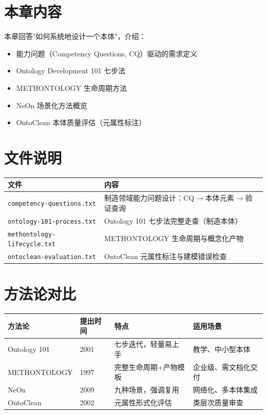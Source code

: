 
\section{本章内容}

本章回答"如何系统地设计一个本体"，介绍：
\begin{itemize}
\item 能力问题（Competency Questions, CQ）驱动的需求定义
\item Ontology Development 101 七步法
\item METHONTOLOGY 生命周期方法
\item NeOn 场景化方法概览
\item OntoClean 本体质量评估（元属性标注）
\end{itemize}

\section{文件说明}

\begin{center}
\begin{tabularx}{\linewidth}{@{}XX@{}}
\toprule
\textbf{文件} & \textbf{内容} \\
\midrule
\texttt{competency-questions.txt} & 制造领域能力问题设计：CQ\(\rightarrow\)本体元素\(\rightarrow\)验证查询 \\
\texttt{ontology-101-process.txt} & Ontology 101 七步法完整走查（制造本体） \\
\texttt{methontology-lifecycle.txt} & METHONTOLOGY 生命周期与概念化产物 \\
\texttt{ontoclean-evaluation.txt} & OntoClean 元属性标注与建模错误检查 \\
\bottomrule
\end{tabularx}
\end{center}

\section{方法论对比}

\begin{center}
\begin{tabularx}{\linewidth}{@{}llXX@{}}
\toprule
\textbf{方法论} & \textbf{提出时间} & \textbf{特点} & \textbf{适用场景} \\
\midrule
Ontology 101 & 2001 & 七步迭代，轻量易上手 & 教学、中小型本体 \\
METHONTOLOGY & 1997 & 完整生命周期+产物模板 & 企业级、需文档化交付 \\
NeOn & 2009 & 九种场景，强调复用 & 网络化、多本体集成 \\
OntoClean & 2002 & 元属性形式化评估 & 类层次质量审查 \\
\bottomrule
\end{tabularx}
\end{center}

